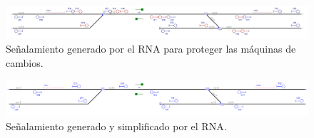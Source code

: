 \lipsum[1]

 \begin{figure}[H]
	\centering
	\includegraphics[width=1\textwidth]{resultados-obtenidos/ejemplo2/images/2_step4.png}
	\centering\caption{Señalamiento generado por el RNA para proteger las máquinas de cambios.}
\end{figure}

\lipsum[1]

 \begin{figure}[H]
	\centering
	\includegraphics[width=1\textwidth]{resultados-obtenidos/ejemplo2/images/2_RNA.png}
	\centering\caption{Señalamiento generado y simplificado por el RNA.}
\end{figure}

\lipsum[1]